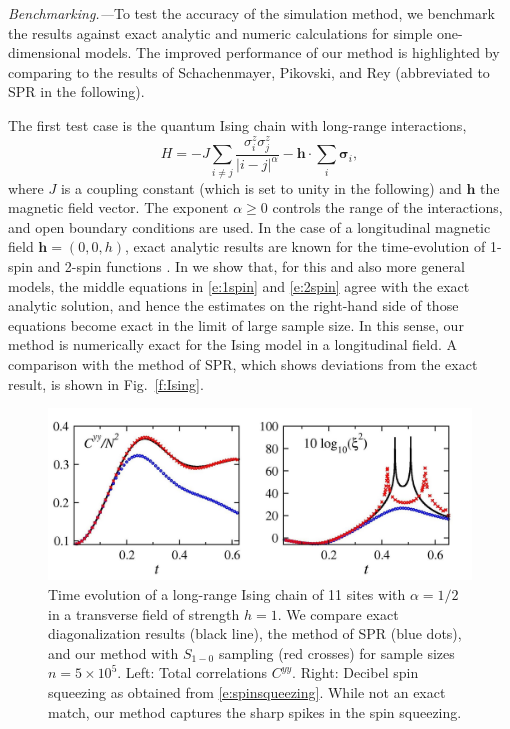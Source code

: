 \documentclass[aps,prl,showpacs,amsmath,amssymb,superscriptaddress,reprint,10pt]{revtex4-1}
\newcommand{\mvec}[1]{\boldsymbol #1}
\begin{document}
{\em Benchmarking.---}To test the accuracy of the simulation method, we benchmark the results against exact analytic and numeric calculations for simple one-dimensional models. The improved performance of our method is highlighted by comparing to the results of Schachenmayer, Pikovski, and Rey \cite{Schachenmayer_etal15} (abbreviated to SPR in the following).

The first test case is the quantum Ising chain with long-range interactions,
\begin{equation}\label{e:Ising}
H=-J\sum_{i\neq j}\frac{\sigma_i^z\sigma_j^z}{|i-j|^\alpha} - \mvec{h}\cdot\sum_i\mvec{\sigma}_i,
\end{equation}
where $J$ is a coupling constant (which is set to unity in the following) and $\mvec{h}$ the magnetic field vector. The exponent $\alpha\geq0$ controls the range of the interactions, and open boundary conditions are used. In the case of a longitudinal magnetic field $\mvec{h}=(0,0,h)$, exact analytic results are known for the time-evolution of 1-spin \cite{Emch66,*Radin70,*Kastner11,*Kastner12} and 2-spin functions \cite{vdWorm_etal13,*FossFeigHazzardBollingerRey13,*KastnerVdWorm15}. In \cite{Note1} we show that, for this and also more general models, the middle equations in \eqref{e:1spin} and \eqref{e:2spin} agree with the exact analytic solution, and hence the estimates on the right-hand side of those equations become exact in the limit of large sample size. In this sense, our method is numerically exact for the Ising model in a longitudinal field. A comparison with the method of SPR, which shows deviations from the exact result, is shown in Fig.~\ref{f:Ising}.

\begin{figure}\centering
\includegraphics[width=\linewidth]{./Jz1hx1_Schach_alph05_N11_nt500000.jpg}
\caption{\label{f:TFIM}%
Time evolution of a long-range Ising chain of 11 sites with $\alpha=1/2$ in a transverse field of strength $h=1$. We compare exact diagonalization results (black line), the method of SPR (blue dots), and our method with $S_{1-0}$ sampling \cite{Note1} (red crosses) for sample sizes $n=5\times10^5$. Left: Total correlations $C^{yy}$. Right: Decibel spin squeezing as obtained from \eqref{e:spinsqueezing}. While not an exact match, our method captures the sharp spikes in the spin squeezing.
}%
\end{figure}
\end{document}

